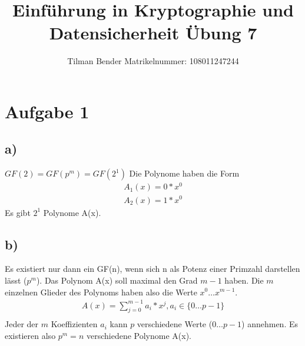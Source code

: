 \documentclass[10pt,a4paper]{article}
\author{Tilman Bender   Matrikelnummer: 108011247244\\}
\title{Einführung in Kryptographie und Datensicherheit Übung 7}
\begin{document}
\maketitle

\section*{Aufgabe 1}

\subsection*{a)}
$GF(2)=GF(p^{m})=GF(2^{1})$ Die Polynome haben die Form 
\begin{align*}
A_{1}(x)=0*x^{0}\\
A_{2}(x)=1*x^{0}
\end{align*}
Es gibt $2^{1}$ Polynome A(x).
\subsection*{b)}
Es existiert nur dann ein GF(n), wenn sich n als Potenz einer Primzahl darstellen lässt ($p^{m}$). Das Polynom A(x) soll maximal den Grad $m-1$ haben. Die $m$ einzelnen Glieder des Polynoms haben also die Werte $x^{0} \dots x^{m-1}$. 
\begin{align*}
A(x)=\sum\limits_{j=0}^{m-1} a_{i}*x^{j}, a_{i} \in \{0 \dots p-1\}\\
\end{align*}
Jeder der $m$ Koeffizienten  $a_i$ kann $p$ verschiedene Werte ($0 \dots p-1$) annehmen. Es existieren also $p^m=n$ verschiedene Polynome A(x).
\end{document}
